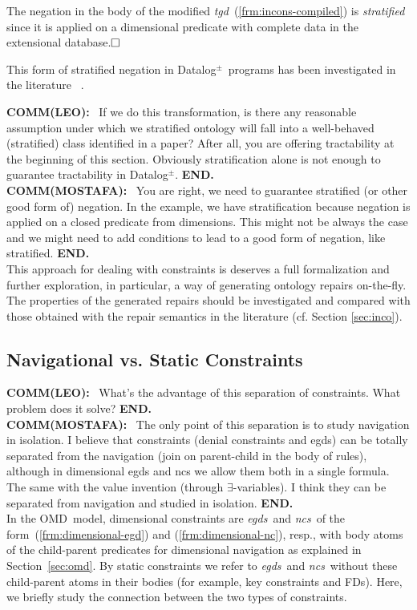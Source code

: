 \documentclass[format=acmsmall, review=false, screen=true]{acmart}
\newcommand{\boxtheorem}{\ensuremath{\hfill \Box}}
\newcommand{\dpm}{{Datalog}$^\pm$}
\newcommand{\omd}{OMD}
\newcommand{\fds}{FDs}
\newcommand{\egds}{{\em egds}}
\newcommand{\tgd}{{\em tgd}}
\newcommand{\ncs}{{\em ncs}}
\newcommand{\red}[1]{{#1}}
\newcommand{\blue}[1]{{#1}}
\newcommand{\comlb}[1]{{\vspace{2mm}\noindent \bf \blue{COMM(LEO):}}~ #1 \hfill {\bf
    END.}\\}
\newcommand{\commos}[1]{{\vspace{2mm}\noindent \bf \blue{COMM(MOSTAFA):}}~ #1 \hfill {\bf
    END.}\\}
\begin{document}
{\begin{example}
 \red{The negation in the body of the modified \tgd \ (\ref{frm:incons-compiled}) is {\em stratified} \cite{cali10} since it is applied on a dimensional predicate with complete data in the extensional database.}\boxtheorem\end{example}

This form of stratified negation in \dpm \ programs has been investigated in the literature ~\cite{alviano15,cali10}.

\comlb{If we do this transformation, is there any reasonable assumption under which we stratified ontology will fall into a well-behaved (stratified) class identified in a paper? After all, you are offering tractability at the beginning of this section. Obviously stratification alone is not enough to guarantee tractability in \dpm.}

\commos{You are right, we need to guarantee stratified (or other good form of) negation. In the example, we have stratification because negation is applied on a closed predicate from dimensions. This might not be always the case and we might need to add conditions to lead to a good form of negation, like stratified.}


This approach for dealing with constraints is deserves a full formalization and further exploration, in particular, a way of generating ontology repairs on-the-fly. The properties of the generated repairs should be investigated and compared with those obtained  with the repair semantics in the literature (cf. Section \ref{sec:inco}).



\subsection*{Navigational vs. Static Constraints}\label{sec:discICs}

\comlb{What's the advantage of this separation of constraints. What problem does it solve?}

\commos{The only point of this separation is to study navigation in isolation. I believe that constraints (denial constraints and egds) can be totally separated from the navigation (join on parent-child in the body of rules), although in dimensional egds and ncs we allow them both in a single formula. The same with the value invention (through $\exists$-variables). I think they can be separated from navigation and studied in isolation.}

In the \omd \ model, dimensional constraints are \egds \ and \ncs \ of the form~(\ref{frm:dimensional-egd}) and (\ref{frm:dimensional-nc}), resp., with body atoms of the child-parent predicates for dimensional navigation as explained in Section~\ref{sec:omd}. By static constraints we refer to \egds \ and \ncs \ without these child-parent atoms in their bodies (for example, key constraints and \fds). Here, we briefly study the connection between the two types of constraints.

}
\end{document}
